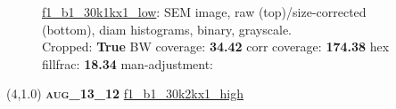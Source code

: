 \begin{figure}[h!]
\label{semimg5}
\caption*{\hyperlink{covtableaug_13_12}{\color{blue} \small \ttfamily f1\_b1\_30k1kx1\_low}: SEM image, raw (top)/size-corrected (bottom), diam histograms, binary, grayscale.\\Cropped: {\bf True} \;\; BW coverage: {\bf 34.42} \:\: corr coverage: {\bf 174.38} \:\: hex fillfrac: {\bf 18.34} \:\: man-adjustment: {\bf \color{blue}{Yes}}}
\end{figure}
\newpage

\begin{textblock}{5}(4,1.0)
{\bf \textsc{aug\_13\_12}}
\hspace{4.5cm}
\hyperlink{covtableaug_13_12}{\color{blue} \large \ttfamily f1\_b1\_30k2kx1\_high}
\end{textblock}

